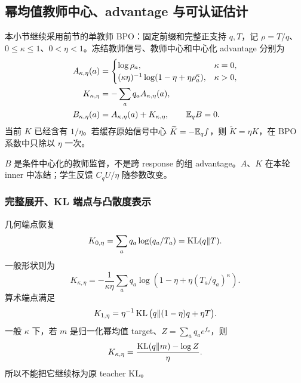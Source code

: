 \subsection{幂均值教师中心、advantage 与可认证估计}
\label{sec:proximal-teacher-center}

本小节继续采用前节的单教师 BPO：固定前缀和完整正支持 $q,T$，记 $\rho=T/q$、$0\le\kappa\le1$、$0<\eta<1$。冻结教师信号、教师中心和中心化 advantage 分别为
\begin{align}
 A_{\kappa,\eta}(a)&=\begin{cases}
 \log\rho_a,&\kappa=0,\\
 (\kappa\eta)^{-1}\log(1-\eta+\eta\rho_a^\kappa),&\kappa>0,
 \end{cases}\\
 K_{\kappa,\eta}&=-\sum_aq_a A_{\kappa,\eta}(a),\\
 B_{\kappa,\eta}(a)&=A_{\kappa,\eta}(a)+K_{\kappa,\eta},\qquad \mathbb E_qB=0.
 \label{eq:center-explicit-definition}
\end{align}
当前 $K$ 已经含有 $1/\eta$。若缓存原始信号中心 $\widetilde K=-\mathbb E_qf$，则 $\widetilde K=\eta K$，在 BPO 系数中只除以 $\eta$ 一次。

$B$ 是条件中心化的教师监督，不是跨 response 的组 advantage。$A$、$K$ 在本轮 inner 中冻结；学生反馈 $C_qU/\eta$ 随参数改变。

\subsubsection{完整展开、KL 端点与凸散度表示}

几何端点恢复
\begin{equation}
 K_{0,\eta}=\sum_aq_a\log(q_a/T_a)=\operatorname{KL}(q\Vert T).
\end{equation}
一般形状则为
\begin{equation}
 \boxed{K_{\kappa,\eta}
 =-\frac1{\kappa\eta}\sum_aq_a
 \log\left(1-\eta+\eta(T_a/q_a)^\kappa\right).}
 \label{eq:center-expanded-k}
\end{equation}
算术端点满足
\begin{equation}
 K_{1,\eta}=\eta^{-1}\operatorname{KL}\big(q\Vert(1-\eta)q+\eta T\big).
\end{equation}
一般 $\kappa$ 下，若 $m$ 是归一化幂均值 target、$Z=\sum_aq_ae^{f_a}$，则
\begin{equation}
 K_{\kappa,\eta}=\frac{\operatorname{KL}(q\Vert m)-\log Z}{\eta}.
\end{equation}
所以不能把它继续标为原 teacher KL。

